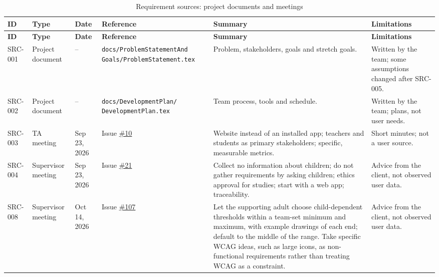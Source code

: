 \documentclass[12pt]{article}
\renewcommand{\_}{\textunderscore\allowbreak}%
\begin{document}
{\footnotesize
\begin{longtable}{@{}
  >{\raggedright\arraybackslash}p{1.3cm} >{\raggedright\arraybackslash}p{1.9cm}
  >{\raggedright\arraybackslash}p{1.4cm}
  >{\raggedright\arraybackslash}p{\dimexpr(\textwidth-4.6cm-10\tabcolsep)/3\relax}
  >{\raggedright\arraybackslash}p{\dimexpr(\textwidth-4.6cm-10\tabcolsep)/3\relax}
  >{\raggedright\arraybackslash}p{\dimexpr(\textwidth-4.6cm-10\tabcolsep)/3\relax}@{}}
\caption{Requirement sources: project documents and meetings}
\label{tab:src-docs}\\
\toprule
\textbf{ID} & \textbf{Type} & \textbf{Date} & \textbf{Reference} &
\textbf{Summary} & \textbf{Limitations} \\
\midrule
\endfirsthead
\toprule
\textbf{ID} & \textbf{Type} & \textbf{Date} & \textbf{Reference} &
\textbf{Summary} & \textbf{Limitations} \\
\midrule
\endhead
\bottomrule
\endlastfoot
{}\label{src:001}SRC-001 & Project document & -- &
\texttt{docs/\allowbreak Problem\allowbreak Statement\allowbreak And\allowbreak
Goals/\allowbreak Problem\allowbreak Statement.tex} & Problem, stakeholders,
goals and stretch goals. & Written by the team; some assumptions changed after
SRC-005. \\
\label{src:002}SRC-002 & Project document & -- &
\texttt{docs/\allowbreak Development\allowbreak Plan/\allowbreak
Development\allowbreak Plan.tex} & Team process, tools and schedule. & Written
by the team; plans, not user needs. \\
\label{src:003}SRC-003 & TA meeting & Sep 23, 2026 & Issue
  \href{https://github.com/AHMEDELZARIA/squigglr/issues/10}{\#10} & Website
  instead of an installed app; teachers and students as primary stakeholders;
  specific, measurable metrics. & Short minutes; not a user source. \\
\label{src:004}SRC-004 & Supervisor meeting & Sep 23, 2026 &
  Issue \href{https://github.com/AHMEDELZARIA/squigglr/issues/21}{\#21} &
  Collect no information about children; do not gather requirements by asking
  children; ethics approval for studies; start with a web app; traceability. &
  Advice from the client, not observed user data. \\
\label{src:008}SRC-008 & Supervisor meeting & Oct 14, 2026 &
  Issue \href{https://github.com/AHMEDELZARIA/squigglr/issues/107}{\#107} & Let
  the supporting adult choose child-dependent thresholds within a team-set
  minimum and maximum, with example drawings of each end; default to the middle
  of the range. Take specific WCAG ideas, such as large icons, as non-functional
  requirements rather than treating WCAG as a constraint. & Advice from the
  client, not observed user data. \\
\end{longtable}
}
\end{document}
